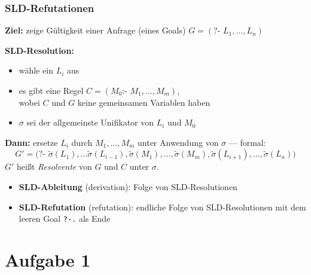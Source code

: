 \documentclass{beamer}
\begin{document}
\begin{frame} \frametitle{SLD-Refutationen}
	\footnotesize
	\textbf{Ziel:} zeige Gültigkeit einer Anfrage (eines Goals) $G = (\texttt{?- } L_1, \dots, L_n)$
	
	\textbf{SLD-Resolution:}
	\begin{itemize}
		\item wähle ein $L_i$ aus
		\item es gibt eine Regel $C = (M_0 \texttt{:- }M_1, \dots, M_m)$,\\
		wobei $C$ und $G$ keine gemeinsamen Variablen haben
		\item $\sigma$ sei der allgemeinste Unifikator von $L_i$ und $M_0$
	\end{itemize}
	\textbf{Dann:} ersetze $L_i$ durch $M_1, \dots, M_m$ unter Anwendung von $\sigma$ --- formal: 
	\begin{equation*}
		G' = \Big( \texttt{?- } \tilde{\sigma}(L_1), \dots \tilde{\sigma}(L_{i-1}) ,  \tilde{\sigma}(M_1), \dots, \tilde{\sigma}(M_m), \tilde{\sigma}(L_{i+1}), \dots, \tilde{\sigma}(L_n) \Big)
	\end{equation*}
	$G'$ heißt \textit{Resolvente} von $G$ und $C$ unter $\sigma$.
	
	\begin{itemize}
		\item\textbf{SLD-Ableitung} (derivation): Folge von SLD-Resolutionen
		\item \textbf{SLD-Refutation} (refutation): endliche Folge von SLD-Resolutionen mit dem leeren Goal \texttt{?-.} als Ende
	\end{itemize}
\end{frame}




\section{Aufgabe 1}
\end{document}
